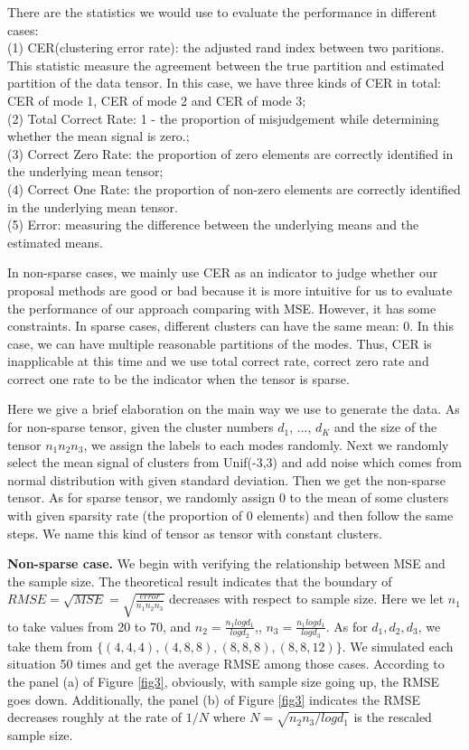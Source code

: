 \documentclass{article}
\begin{document}
There are the statistics we would use to evaluate the performance in different cases:\\
(1) CER(clustering error rate): the adjusted rand index between two paritions. This statistic measure the agreement between the true partition and estimated partition of the data tensor. In this case, we have three kinds of CER in total: CER of mode 1, CER of mode 2 and CER of mode 3;\\
(2) Total Correct Rate: 1 - the proportion of misjudgement while determining whether the mean signal is zero.;\\
(3) Correct Zero Rate: the proportion of zero elements are correctly identified in the underlying mean tensor;\\
(4) Correct One Rate: the proportion of non-zero elements are correctly identified in the underlying mean tensor.\\
(5) Error: measuring the difference between the underlying means and the estimated means.\par  

In non-sparse cases, we mainly use CER as an indicator to judge whether our proposal methods are good or bad because it is more intuitive for us to evaluate the performance of our approach comparing with MSE. However, it has some constraints. In sparse cases, different clusters can have the same mean: 0. In this case, we can have multiple reasonable partitions of the modes. Thus, CER is inapplicable at this time and we use  total correct rate, correct zero rate and correct one rate to be the indicator when the tensor is sparse.
\par


Here we give a brief elaboration on the main way we use to generate the data. As for non-sparse tensor, given the cluster numbers $d_1$, ..., $d_K$ and the size of the tensor $n_1n_2n_3$, we assign the labels to each modes randomly. Next we randomly select the mean signal of clusters from Unif(-3,3) and add noise which comes from normal distribution with given standard deviation. Then we get the non-sparse tensor. As for sparse tensor, we randomly assign 0 to the mean of some  clusters with given sparsity rate (the proportion of 0 elements) and then follow the same steps. We name this kind of tensor as tensor with constant clusters.\par 

\textbf{Non-sparse case.} We begin with verifying the relationship between MSE and the sample size. The theoretical result indicates that the boundary of $RMSE=\sqrt{MSE}= \sqrt{\frac{error}{n_1n_2n_3}}$ decreases with respect to sample size. Here we let $n_1$ to take values from 20 to 70, and $n_2=\frac{n_1logd_1}{logd_2}$,, $n_3 = \frac{n_1logd_1}{logd_3}$. As for $d_1, d_2, d_3$, we take them from $\{(4,4,4),(4,8,8),(8,8,8),(8,8,12)\}$. We simulated each situation 50 times and get the average RMSE among those cases. According to the panel (a) of Figure \ref{fig3}, obviously, with sample size going up, the RMSE goes down. Additionally, the panel (b) of Figure \ref{fig3} indicates the RMSE decreases roughly at the rate of $1/N$ where $N=\sqrt{n_2n_3/logd_1}$ is the rescaled sample size.\par 
\end{document}
